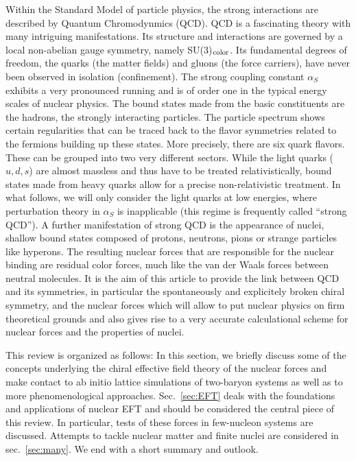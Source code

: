 \documentclass[aps,rmp,nofootinbib,twocolumn,floatfix]{revtex4}
\begin{document}
Within the Standard Model of particle physics, the strong interactions
are described by Quantum Chromodynmics (QCD).
QCD is a fascinating theory with many intriguing
manifestations. Its structure and interactions are governed by a local
non-abelian gauge symmetry, namely  SU(3)$_{\rm color}$.
Its fundamental degrees of freedom, the quarks (the matter fields) and 
gluons (the force carriers), have never been observed in isolation 
(confinement). The strong coupling
constant $\alpha_S$ exhibits a very pronounced running and is of order one
in the typical energy scales of nuclear physics. The bound states made
from the basic constituents are the hadrons, the strongly interacting
particles. The particle spectrum shows certain regularities that can be
traced back to the flavor symmetries related to the fermions building 
up these states. More precisely, there are six quark flavors. These can 
be grouped into two very different sectors.
While the light quarks ($u,d,s$) are almost massless and thus have to 
be treated relativistically, bound states made from heavy quarks allow for a
precise non-relativistic treatment. In what follows, we will only consider the
light quarks at low energies, where perturbation theory in  $\alpha_S$ is
inapplicable (this regime is frequently called ``strong QCD''). 
A further manifestation  of strong QCD is the appearance of nuclei, 
shallow bound states composed of protons, neutrons, pions or strange 
particles like hyperons. The resulting nuclear forces that are responsible 
for the nuclear binding are residual color  forces, much like the van der 
Waals forces between neutral molecules. It is
the aim of this article to provide the link between QCD and its symmetries,
in particular the spontaneously and explicitely broken chiral symmetry, and
the nuclear forces which will allow to put nuclear physics on  firm
theoretical grounds and also gives rise to a very accurate calculational
scheme for nuclear forces and the properties of nuclei.

This review is organized as follows: In this section, we briefly discuss
some of the concepts underlying the chiral effective field theory of the
nuclear forces and make contact to ab initio lattice simulations of
two-baryon systems as well as to more phenomenological approaches.
Sec.~\ref{sec:EFT} deals with the foundations and applications of
nuclear EFT and should be considered the central piece of this review.
In particular, tests of these forces  in few-nucleon systems are discussed.
Attempts to tackle nuclear matter and finite nuclei are considered in
sec.~\ref{sec:many}. We end with a short summary and outlook.
\end{document}
